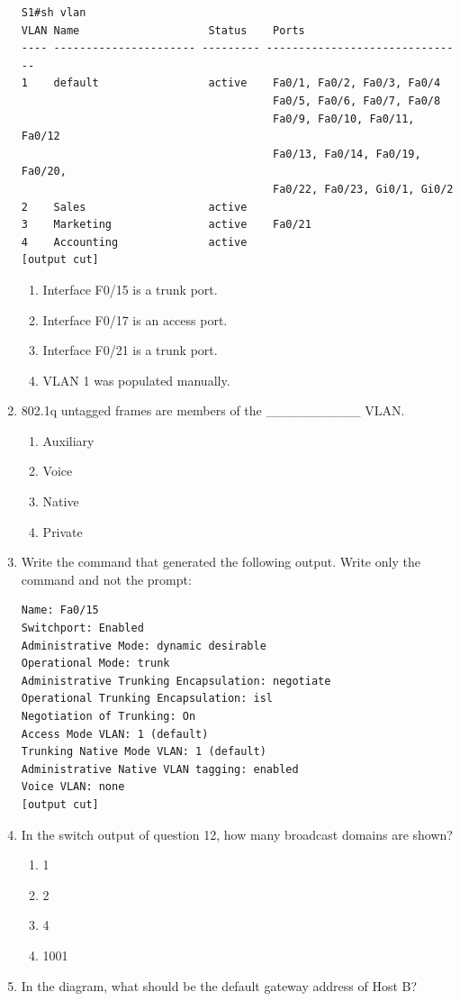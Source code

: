 \documentclass[b5paper,11pt]{memoir}
\begin{document}
\begin{enumerate}
\begin{verbatim}
S1#sh vlan
VLAN Name                    Status    Ports
---- ---------------------- --------- -------------------------------
1    default                 active    Fa0/1, Fa0/2, Fa0/3, Fa0/4
                                       Fa0/5, Fa0/6, Fa0/7, Fa0/8
                                       Fa0/9, Fa0/10, Fa0/11, Fa0/12
                                       Fa0/13, Fa0/14, Fa0/19, Fa0/20,
                                       Fa0/22, Fa0/23, Gi0/1, Gi0/2
2    Sales                   active
3    Marketing               active    Fa0/21
4    Accounting              active
[output cut]
\end{verbatim}

  \begin{enumerate}
  \tightlist
  \item
    Interface F0/15 is a trunk port.
  \item
    Interface F0/17 is an access port.
  \item
    Interface F0/21 is a trunk port.
  \item
    VLAN 1 was populated manually.
  \end{enumerate}
\item
  802.1q untagged frames are members of the \_\_\_\_\_\_\_\_\_\_ VLAN.

  \begin{enumerate}
  \tightlist
  \item
    Auxiliary
  \item
    Voice
  \item
    Native
  \item
    Private
  \end{enumerate}
\item
   Write the command
  that generated the following output. Write only the command and not
  the prompt:

\begin{verbatim}
Name: Fa0/15
Switchport: Enabled
Administrative Mode: dynamic desirable
Operational Mode: trunk
Administrative Trunking Encapsulation: negotiate
Operational Trunking Encapsulation: isl
Negotiation of Trunking: On
Access Mode VLAN: 1 (default)
Trunking Native Mode VLAN: 1 (default)
Administrative Native VLAN tagging: enabled
Voice VLAN: none
[output cut]
\end{verbatim}
\item
  In the switch output of question 12, how many broadcast domains are
  shown?

  \begin{enumerate}
  \tightlist
  \item
    1
  \item
    2
  \item
    4
  \item
    1001
  \end{enumerate}
\item
  In the diagram, what should be the default gateway address of Host B?


\end{enumerate}
\end{document}
